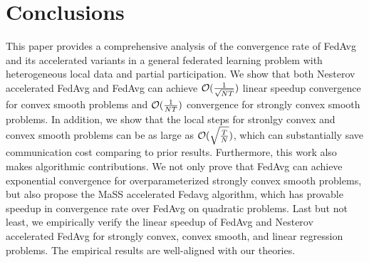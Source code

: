 
\section{Conclusions}
This paper provides a comprehensive analysis of the convergence rate of FedAvg
and its accelerated variants in a general federated learning problem with heterogeneous local data and partial participation. We show that both Nesterov accelerated FedAvg and FedAvg
can achieve {\small{${\mathcal{O}}(\frac{1}{\sqrt{NT}})$}} linear speedup convergence for convex smooth problems and {\small{${\mathcal{O}}(\frac{1}{NT})$}} convergence for strongly 
convex smooth problems. In addition, we show that the local steps for stronlgy convex and convex smooth problems can be as large as {\small{${\mathcal{O}}(\sqrt{\frac{T}{N}})$}}, which can substantially save communication cost comparing to prior results. 
Furthermore, this work also makes algorithmic contributions. We not only prove that FedAvg can achieve exponential convergence for overparameterized strongly convex smooth problems, but also propose the MaSS accelerated Fedavg algorithm, which has provable speedup in convergence rate over FedAvg on quadratic problems. Last but not least, we empirically
verify the linear speedup of FedAvg and Nesterov accelerated FedAvg for strongly convex, convex smooth, and linear regression problems. The empirical results are well-aligned with our theories. 